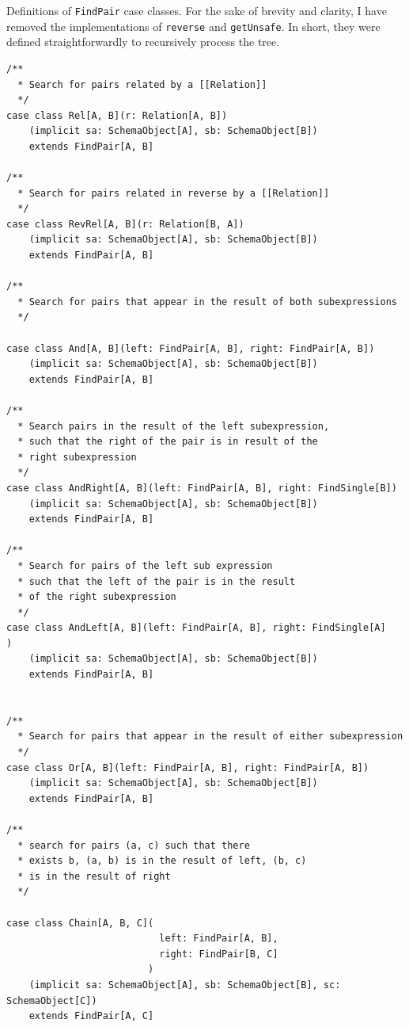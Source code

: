 \documentclass[12pt,a4paper,twoside,openright]{report}
\newcommand\codeName[1]{\texttt{#1}}
\renewcommand{\baselinestretch}{1.1}    %
\begin{document}
Definitions of \codeName{FindPair} case classes.
For the sake of brevity and clarity, I have removed the implementations of \codeName{reverse} and \codeName{getUnsafe}. In short, they were defined straightforwardly to recursively process the tree.
\renewcommand{\baselinestretch}{0.8}
\begin{framed}
\begin{verbatim}
/**
  * Search for pairs related by a [[Relation]]
  */
case class Rel[A, B](r: Relation[A, B])
    (implicit sa: SchemaObject[A], sb: SchemaObject[B])
    extends FindPair[A, B]

/**
  * Search for pairs related in reverse by a [[Relation]]
  */
case class RevRel[A, B](r: Relation[B, A])
    (implicit sa: SchemaObject[A], sb: SchemaObject[B])
    extends FindPair[A, B]

/**
  * Search for pairs that appear in the result of both subexpressions
  */

case class And[A, B](left: FindPair[A, B], right: FindPair[A, B])
    (implicit sa: SchemaObject[A], sb: SchemaObject[B])
    extends FindPair[A, B]

/**
  * Search pairs in the result of the left subexpression,
  * such that the right of the pair is in result of the
  * right subexpression
  */
case class AndRight[A, B](left: FindPair[A, B], right: FindSingle[B])
    (implicit sa: SchemaObject[A], sb: SchemaObject[B])
    extends FindPair[A, B]

/**
  * Search for pairs of the left sub expression
  * such that the left of the pair is in the result
  * of the right subexpression
  */
case class AndLeft[A, B](left: FindPair[A, B], right: FindSingle[A]                        )
    (implicit sa: SchemaObject[A], sb: SchemaObject[B])
    extends FindPair[A, B]


/**
  * Search for pairs that appear in the result of either subexpression
  */
case class Or[A, B](left: FindPair[A, B], right: FindPair[A, B])
    (implicit sa: SchemaObject[A], sb: SchemaObject[B])
    extends FindPair[A, B]

/**
  * search for pairs (a, c) such that there
  * exists b, (a, b) is in the result of left, (b, c)
  * is in the result of right
  */

case class Chain[A, B, C](
                           left: FindPair[A, B],
                           right: FindPair[B, C]
                         )
    (implicit sa: SchemaObject[A], sb: SchemaObject[B], sc: SchemaObject[C])
    extends FindPair[A, C]


\end{verbatim}
\end{framed}
\end{document}
